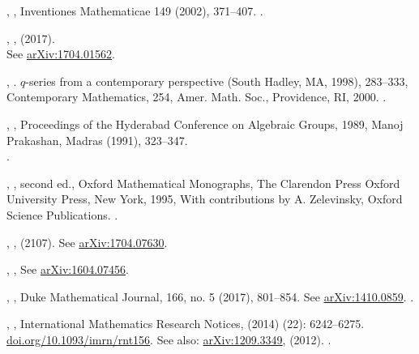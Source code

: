 \documentclass[12pt]{amsart}
\theoremstyle{plain}
\theoremstyle{definition}
\theoremstyle{remark}
\begin{document}
\begin{thebibliography}{10}
, 
, 
Inventiones Mathematicae 149 (2002), 371--407. .


,
, (2017).\\
See \href{http://arxiv.org/abs/arXiv:1704.01562}{arXiv:1704.01562}.

,
.
$q$-series from a contemporary perspective (South Hadley, MA, 1998), 283--333, 
Contemporary Mathematics, 254, Amer. Math. Soc., Providence, RI, 2000. .


,
, 
Proceedings of the Hyderabad Conference on Algebraic Groups, 1989, Manoj Prakashan, Madras (1991), 323--347. \\
.


,
, second ed., Oxford
Mathematical Monographs, The Clarendon Press Oxford University Press, New York, 1995, 
With contributions by A. Zelevinsky, Oxford Science Publications. .
  
 ,
 , (2107).
 See \href{http://arxiv.org/abs/arXiv:1704.07630}{arXiv:1704.07630}.
 
 
  ,
  ,
See \href{http://arxiv.org/abs/arXiv:1604.07456}{arXiv:1604.07456}.

,
, 	
Duke Mathematical Journal,  166, no. 5 (2017), 801--854.
See \href{http://arxiv.org/abs/1410.0859}{arXiv:1410.0859}.  .



,
,
International Mathematics Research Notices, (2014) (22): 6242--6275. 
\href{https://doi.org/10.1093/imrn/rnt156}{doi.org/10.1093/imrn/rnt156}. See also:
\href{http://arxiv.org/abs/1209.3349}{arXiv:1209.3349}, (2012). .


\end{thebibliography}
\end{document}
